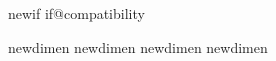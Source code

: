 


\makeatletter

\ifx\@compatibilitytrue\@undefined
  \csname newif\expandafter\endcsname
       \csname if@compatibility\endcsname
\fi


\ifx\raisebox\@undefined
\def\raisebox#1#2{{%
  \setbox0=\hbox{#2}\def\depth{\dp0}\leavevmode\raise#1\box\z@}}
\fi

\ifx\@@underline\@undefined
\let\@@underline\underline
\def\underline{%
  \ifmmode\expandafter\@@underline\else\expandafter\underbar\fi}
\fi

\ifx\sbox\@undefined
\def\sbox#1{\setbox#1\hbox}
\fi


\let\savedRP\RequirePackage
\def\RequirePackage#1{%
  \let\RequirePackage\savedRP
  \ifx\includegraphics\@undefined
  \fi\relax}




\ifx\pfg@dp\@undefined
\csname newdimen\endcsname\pfg@dp
\csname newdimen\endcsname\pfg@wd
\csname newdimen\endcsname\pfg@dx
\csname newdimen\endcsname\pfg@dy
\fi

\resetatcatcode
